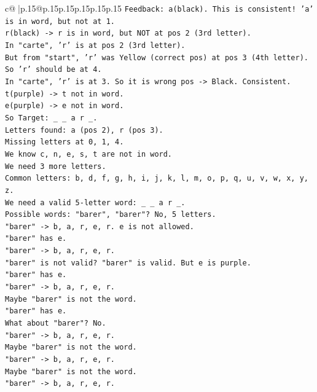 \documentclass{article}
\begin{document}
{\begin{supertabular}{c@{$\;$}|p{.15\linewidth}@{}p{.15\linewidth}p{.15\linewidth}p{.15\linewidth}p{.15\linewidth}p{.15\linewidth}}
{{{\texttt{Feedback: a(black). This is consistent! 'a' is in word, but not at 1.} \\
\texttt{r(black) {-}> r is in word, but NOT at pos 2 (3rd letter).} \\
\texttt{In "carte", 'r' is at pos 2 (3rd letter).} \\
\texttt{But from "start", 'r' was Yellow (correct pos) at pos 3 (4th letter).} \\
\texttt{So 'r' should be at 4.} \\
\texttt{In "carte", 'r' is at 3. So it is wrong pos {-}> Black. Consistent.} \\
\texttt{t(purple) {-}> t not in word.} \\
\texttt{e(purple) {-}> e not in word.} \\
\texttt{So Target: \_ \_ a r \_.} \\
\texttt{Letters found: a (pos 2), r (pos 3).} \\
\texttt{Missing letters at 0, 1, 4.} \\
\texttt{We know c, n, e, s, t are not in word.} \\
\texttt{We need 3 more letters.} \\
\texttt{Common letters: b, d, f, g, h, i, j, k, l, m, o, p, q, u, v, w, x, y, z.} \\
\texttt{We need a valid 5{-}letter word: \_ \_ a r \_.} \\
\texttt{Possible words: "barer", "barer"? No, 5 letters.} \\
\texttt{"barer" {-}> b, a, r, e, r. e is not allowed.} \\
\texttt{"barer" has e.} \\
\texttt{"barer" {-}> b, a, r, e, r.} \\
\texttt{"barer" is not valid? "barer" is valid. But e is purple.} \\
\texttt{"barer" has e.} \\
\texttt{"barer" {-}> b, a, r, e, r.} \\
\texttt{Maybe "barer" is not the word.} \\
\texttt{"barer" has e.} \\
\texttt{What about "barer"? No.} \\
\texttt{"barer" {-}> b, a, r, e, r.} \\
\texttt{Maybe "barer" is not the word.} \\
\texttt{"barer" {-}> b, a, r, e, r.} \\
\texttt{Maybe "barer" is not the word.} \\
\texttt{"barer" {-}> b, a, r, e, r.} \\
}}}
\end{supertabular}}
\end{document}
